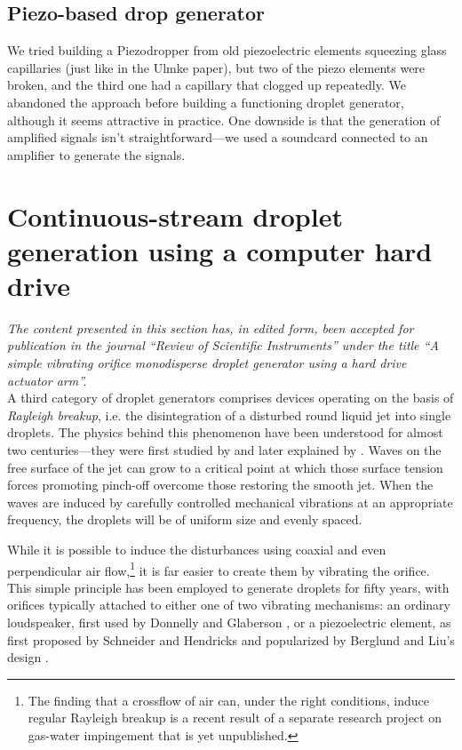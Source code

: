 \documentclass[11.5pt,oneside]{book}
\begin{document}
\subsection{Piezo-based drop generator}
We tried building a Piezodropper from old piezoelectric elements squeezing glass
capillaries (just like in the Ulmke paper), but two of the piezo elements were
broken, and the third one had a capillary that clogged up repeatedly. We
abandoned the approach before building a functioning droplet generator, although
it seems attractive in practice. One downside is that the generation of
amplified signals isn't straightforward---we used a soundcard connected to an
amplifier to generate the signals.

\section{Continuous-stream droplet generation using a computer hard drive}
\noindent \emph{The content presented in this section has, in edited form,
        been accepted for publication in the journal ``Review of Scientific
        Instruments'' under the title ``A simple vibrating orifice monodisperse
 droplet generator using a hard drive actuator arm''.}\\

A third category of droplet generators comprises devices operating on the basis
of \emph{Rayleigh breakup}, i.e. the disintegration of a disturbed round liquid
jet into single droplets. The physics behind this phenomenon have been
understood for almost two centuries—they were first studied
by \citet{Savart33} and later explained by \citet{Rayleigh79}. Waves on
the free surface of the jet can grow to a critical point at which those surface
tension forces promoting pinch-off overcome those restoring the smooth jet. When
the waves are induced by carefully controlled mechanical vibrations at an
appropriate frequency, the droplets will be of uniform size and evenly spaced.

While it is possible to induce the disturbances using coaxial \cite{Green89} and
even perpendicular air flow,\footnote{The finding that a crossflow of air can,
        under the right conditions, induce regular Rayleigh breakup is a recent
        result of a separate research project on gas-water impingement that is
yet unpublished.} it is far easier to create them by vibrating the orifice.
This simple principle has been employed to generate droplets for fifty years,
with orifices typically attached to either one of two vibrating mechanisms: an
ordinary loudspeaker, first used by Donnelly and Glaberson \cite{Donnelly66}, or
a piezoelectric element, as first proposed by Schneider and
Hendricks \cite{Schneider64} and popularized by Berglund and Liu's
design \cite{Berglund73}. 
\end{document}
